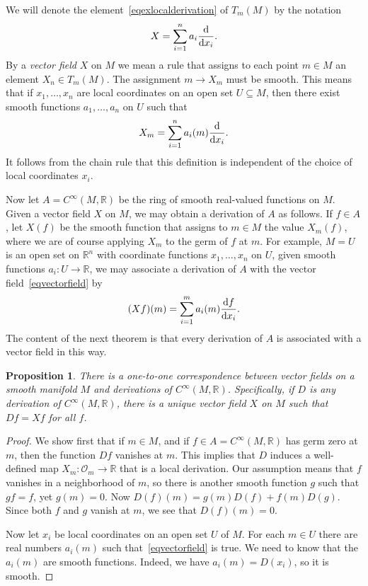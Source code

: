 \documentclass[12pt,reqno]{book}%
\newtheorem{proposition}{Proposition}[chapter]
\theoremstyle{definition}
\theoremstyle{remark}
\theoremstyle{theorem}
\theoremstyle{remark}
\begin{document}
We will denote the element~\eqref{eqexlocalderivation} of $T_m(M)$ by the notation
\[
    X = \sum_{i = 1}^{n} a_i \dv{x_i}.
\]
By a \emph{vector field} $X$ on $M$ we mean a rule that assigns to each point $m \in M$ an element $X_n \in T_m(M)$.
The assignment $m \to X_m$ must be smooth.
This means that if $x_1, \ldots, x_n$ are local coordinates on an open set $U \subseteq M$, then there exist smooth functions $a_1, \ldots, a_n$ on $U$ such that
\begin{equation}\label{eqvectorfield}
    X_m = \sum_{i = 1}^{n} a_i(m) \dv{x_i}.
\end{equation}
It follows from the chain rule that this definition is independent of the choice of local coordinates $x_i$.

Now let $A = C^\infty(M, \mathbb{R})$ be the ring of smooth real-valued functions on $M$.
Given a vector field $X$ on $M$, we may obtain a derivation of $A$ as follows.
If $f \in A$, let $X(f)$ be the smooth function that assigns to $m \in M$ the value $X_m(f)$, where we are of course applying $X_m$ to the germ of $f$ at $m$.
For example, $M = U$ is an open set on $\mathbb{R}^{n}$ with coordinate functions $x_1, \ldots, x_n$ on $U$, given smooth functions $a_i : U \to \mathbb{R}$, we may associate a derivation of $A$ with the vector field~\eqref{eqvectorfield} by
\begin{equation}\label{eqderivationassociatedwithvectorfield}
    (Xf)(m) = \sum_{i = 1}^{m} a_i(m) \dv{f}{x_i}(m).
\end{equation}
The content of the next theorem is that every derivation of $A$ is associated with a vector field in this way.

\begin{proposition}\label{prop6.3}%
    There is a one-to-one correspondence between vector fields on a smooth manifold $M$ and derivations of $C^\infty(M, \mathbb{R})$.
    Specifically, if $D$ is any derivation of $C^\infty(M, \mathbb{R})$, there is a unique vector field $X$ on $M$ such that $Df = Xf$ for all $f$.
\end{proposition}%
\begin{proof}%
    We show first that if $m \in M$, and if $f \in A = C^\infty(M, \mathbb{R})$ has germ zero at $m$, then the function $Df$ vanishes at $m$.
    This implies that $D$ induces a well-defined map $X_m : \mathcal{O}_m \to \mathbb{R}$ that is a local derivation.
    Our assumption means that $f$ vanishes in a neighborhood of $m$, so there is another smooth function $g$ such that $gf = f$, yet $g(m) = 0$.
    Now $D(f)(m) = g(m)D(f) + f(m)D(g)$.
    Since both $f$ and $g$ vanish at $m$, we see that $D(f)(m) = 0$.

    Now let $x_i$ be local coordinates on an open set $U$ of $M$.
    For each $m \in U$ there are real numbers $a_i(m)$ such that~\eqref{eqvectorfield} is true.
    We need to know that the $a_i(m)$ are smooth functions.
    Indeed, we have $a_i(m) = D(x_i)$, so it is smooth.
\end{proof}%
\end{document}
